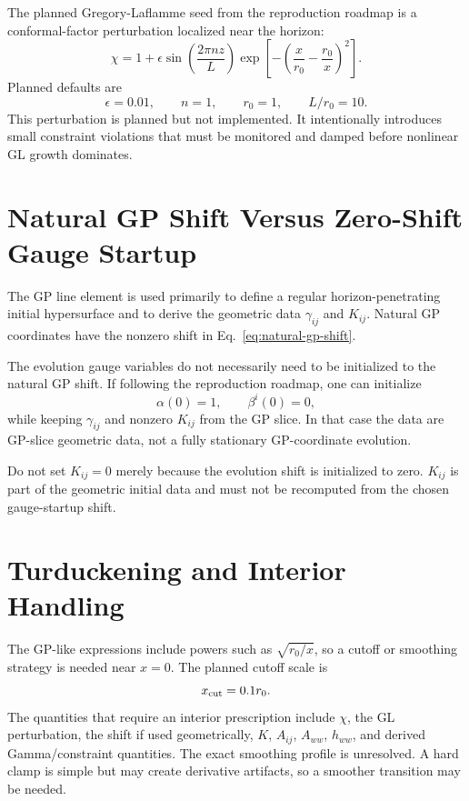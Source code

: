 \documentclass[11pt]{article}
\begin{document}
The planned Gregory-Laflamme seed from the reproduction roadmap is a
conformal-factor perturbation localized near the horizon:
\begin{equation}
  \chi
  =
  1
  +
  \epsilon
  \sin\left(\frac{2\pi n z}{L}\right)
  \exp\left[
    -
    \left(
      \frac{x}{r_0}
      -
      \frac{r_0}{x}
    \right)^2
  \right].
  \label{eq:gl-seed}
\end{equation}
Planned defaults are
\begin{equation}
  \epsilon=0.01,
  \qquad
  n=1,
  \qquad
  r_0=1,
  \qquad
  L/r_0=10 .
\end{equation}
This perturbation is planned but not implemented. It intentionally introduces
small constraint violations that must be monitored and damped before nonlinear
GL growth dominates.

\section{Natural GP Shift Versus Zero-Shift Gauge Startup}

The GP line element is used primarily to define a regular
horizon-penetrating initial hypersurface and to derive the geometric data
\(\gamma_{ij}\) and \(K_{ij}\). Natural GP coordinates have the nonzero shift
in Eq.~\eqref{eq:natural-gp-shift}.

The evolution gauge variables do not necessarily need to be initialized to the
natural GP shift. If following the reproduction roadmap, one can initialize
\begin{equation}
  \alpha(0)=1,
  \qquad
  \beta^i(0)=0,
\end{equation}
while keeping \(\gamma_{ij}\) and nonzero \(K_{ij}\) from the GP slice. In that
case the data are GP-slice geometric data, not a fully stationary
GP-coordinate evolution.

Do not set \(K_{ij}=0\) merely because the evolution shift is initialized to
zero. \(K_{ij}\) is part of the geometric initial data and must not be
recomputed from the chosen gauge-startup shift.

\section{Turduckening and Interior Handling}

The GP-like expressions include powers such as \(\sqrt{r_0/x}\), so a cutoff
or smoothing strategy is needed near \(x=0\). The planned cutoff scale is
\begin{equation}
  x_{\rm cut} = 0.1 r_0 .
\end{equation}
The quantities that require an interior prescription include \(\chi\), the GL
perturbation, the shift if used geometrically, \(K\), \(A_{ij}\), \(A_{ww}\),
\(h_{ww}\), and derived Gamma/constraint quantities. The exact smoothing
profile is unresolved. A hard clamp is simple but may create derivative
artifacts, so a smoother transition may be needed.
\end{document}
